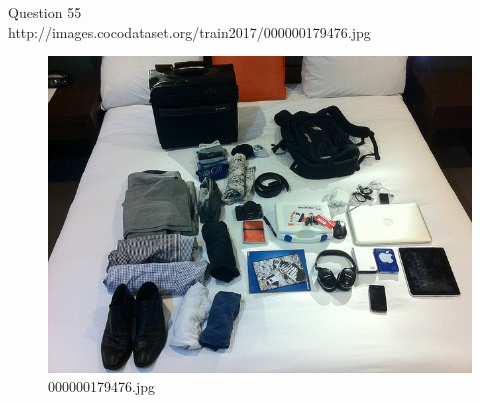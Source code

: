 Question 55\\
http://images.cocodataset.org/train2017/000000179476.jpg
\begin{figure}[h]
    \centering
    \includegraphics[width=0.8\linewidth]{../image set/hard/000000179476.jpg}
    \caption{000000179476.jpg}
\end{figure} 
